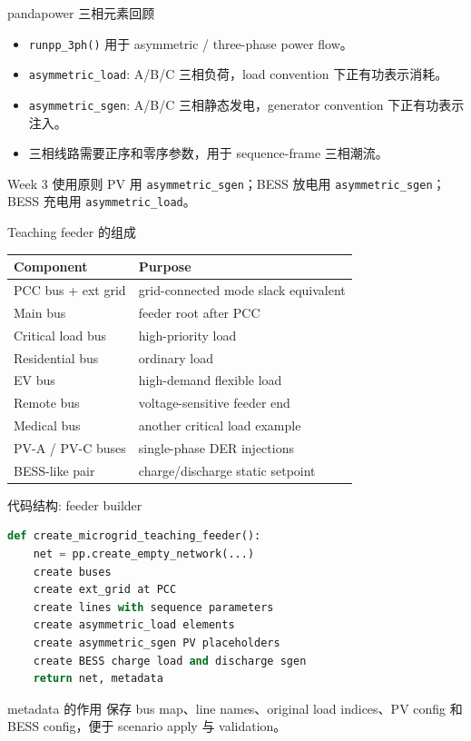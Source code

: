 \documentclass[aspectratio=169,11pt]{beamer}
\begin{document}
\begin{frame}{pandapower 三相元素回顾}
\begin{itemize}
  \item \texttt{runpp\_3ph()} 用于 asymmetric / three-phase power flow。
  \item \texttt{asymmetric\_load}: A/B/C 三相负荷，load convention 下正有功表示消耗。
  \item \texttt{asymmetric\_sgen}: A/B/C 三相静态发电，generator convention 下正有功表示注入。
  \item 三相线路需要正序和零序参数，用于 sequence-frame 三相潮流。
\end{itemize}
\begin{block}{Week 3 使用原则}
PV 用 \texttt{asymmetric\_sgen}；BESS 放电用 \texttt{asymmetric\_sgen}；BESS 充电用 \texttt{asymmetric\_load}。
\end{block}
\end{frame}

\begin{frame}{Teaching feeder 的组成}
\begin{table}
\centering
\scriptsize
\begin{tabular}{ll}
\toprule
Component & Purpose \\
\midrule
PCC bus + ext grid & grid-connected mode slack equivalent \\
Main bus & feeder root after PCC \\
Critical load bus & high-priority load \\
Residential bus & ordinary load \\
EV bus & high-demand flexible load \\
Remote bus & voltage-sensitive feeder end \\
Medical bus & another critical load example \\
PV-A / PV-C buses & single-phase DER injections \\
BESS-like pair & charge/discharge static setpoint \\
\bottomrule
\end{tabular}
\end{table}
\end{frame}

\begin{frame}[fragile]{代码结构: feeder builder}
\begin{lstlisting}[language=Python]
def create_microgrid_teaching_feeder():
    net = pp.create_empty_network(...)
    create buses
    create ext_grid at PCC
    create lines with sequence parameters
    create asymmetric_load elements
    create asymmetric_sgen PV placeholders
    create BESS charge load and discharge sgen
    return net, metadata
\end{lstlisting}
\begin{block}{metadata 的作用}
保存 bus map、line names、original load indices、PV config 和 BESS config，便于 scenario apply 与 validation。
\end{block}
\end{frame}
\end{document}
